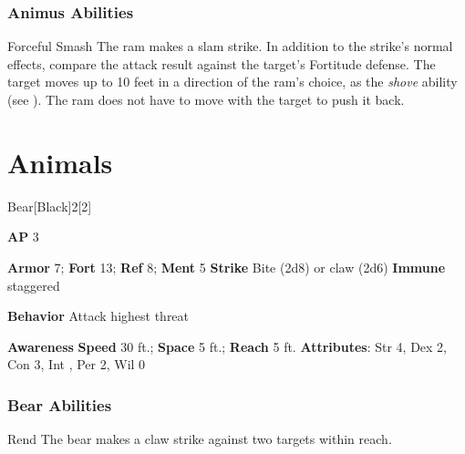 \subsubsection{Animus Abilities}

\begin{ability}{Forceful Smash}
The ram makes a slam strike.
In addition to the strike's normal effects, compare the attack result against the target's Fortitude defense.
\hit The target moves up to 10 feet in a direction of the ram's choice, as the \textit{shove} ability (see ).
The ram does not have to move with the target to push it back.
\end{ability}

\section{Animals}
\begin{monsection}{Bear}[Black]{2}[2]
\vspace{-1em}\vspace{-1em}
\begin{spellcontent}
\begin{spelltargetinginfo}
{\textbf{AP} 3}

\pari \textbf{Armor} 7;
\textbf{Fort} 13;
\textbf{Ref} 8;
\textbf{Ment} 5
\pari \textbf{Strike} Bite  (2d8) or claw  (2d6)
\pari \textbf{Immune} staggered


\pari \textbf{Behavior} Attack highest threat
\end{spelltargetinginfo}
\end{spellcontent}

\begin{monsterfooter}
\pari \textbf{Awareness} 
\pari \textbf{Speed} 30 ft.;
\textbf{Space} 5 ft.;
\textbf{Reach} 5 ft.
\pari \textbf{Attributes}:
Str 4,
Dex 2,
Con 3,
Int ,
Per 2,
Wil 0
\end{monsterfooter}
\end{monsection}


\subsubsection{Bear Abilities}

\begin{ability}{Rend}
The bear makes a claw strike against two targets within reach.
\end{ability}


